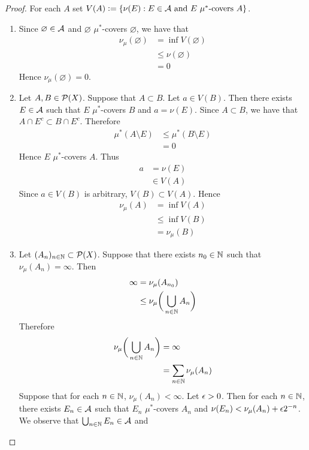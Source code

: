 \documentclass{book}
\begin{document}
	\begin{proof} For each $A$ set $V(A) \vcentcolon= \{\nu(E): E \in \mathcal{A} \text{ and $E$ $\mu^*$-covers $A$} \}$.
		\begin{enumerate}
			\item Since $\varnothing \in \mathcal{A}$ and $\varnothing$ $\mu^*$-covers $\varnothing$, we have that
			\begin{align*}
				\nu_{\mu}(\varnothing) 
				& = \inf V(\varnothing) \\
				& \leq \nu(\varnothing) \\
				& = 0
			\end{align*}
			Hence $\nu_{\mu}(\varnothing) = 0$. 
			\item Let $A, B \in \mathcal{P}(X)$. Suppose that $A \subset B$. Let $a \in V(B)$. Then there exists $E \in \mathcal{A}$ such that $E$ $\mu^*$-covers $B$ and $a = \nu(E)$. Since $A \subset B$, we have that $A \cap E^c \subset B \cap E^c$. Therefore
			\begin{align*}
				\mu^*(A \setminus E)
				& \leq \mu^*(B \setminus E) \\
				& = 0
			\end{align*}
			Hence $E$ $\mu^*$-covers $A$. Thus 
			\begin{align*}
				a
				& = \nu(E) \\
				& \in V(A)
			\end{align*}
			Since $a \in V(B)$ is arbitrary, $V(B) \subset V(A)$. Hence 
			\begin{align*}
				\nu_{\mu}(A)
				& = \inf V(A) \\
				& \leq \inf V(B) \\
				& = \nu_{\mu}(B)
			\end{align*}
			\item Let $(A_n)_{n \in \mathbb{N}} \subset \mathcal{P}(X)$.  Suppose that there exists $n_0 \in \mathbb{N}$ such that $\nu_{\mu}(A_n) = \infty$. Then 
			\begin{align*}
				\infty 
				& = \nu_{\mu}(A_{n_0}) \\
				& \leq \nu_{\mu}\bigg(  \bigcup\limits_{n \in \mathbb{N}}A_n \bigg)
			\end{align*}
			Therefore
			\begin{align*}
				\nu_{\mu} \bigg( \bigcup_{n \in \mathbb{N}} A_n \bigg)
				& = \infty \\
				& = \sum\limits_{n \in \mathbb{N}} \nu_{\mu}(A_n)
			\end{align*}
			Suppose that for each $n \in \mathbb{N}$, $\nu_{\mu}(A_n) < \infty$. Let $\epsilon > 0$. Then for each $n \in \mathbb{N}$, there exists $E_n \in \mathcal{A}$ such that $E_n$ $\mu^*$-covers $A_n$ and $\nu(E_n) < \nu_{\mu}(A_n) + \epsilon 2^{-n}$. We observe that $\bigcup_{n \in \mathbb{N}} E_n \in \mathcal{A}$ and 

\end{enumerate}
\end{proof}
\end{document}
